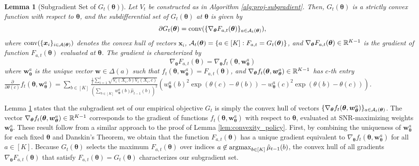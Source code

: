 \documentclass{article}
\newtheorem{lemma}{Lemma}
\begin{document}
\begin{lemma}[Subgradient Set of $G_t(\bm{\theta})$]\label{lem:subgradient_lemma}
    Let $V_t$ be constructed as in Algorithm \ref{alg:proj-subgradient}. Then, $G_t(\bm{\theta})$ is a strictly convex function with respect to $\bm{\theta}$, and the subdifferential set of $G_t(\bm\theta)$ at $\bm{\theta}$ is given by 
    \begin{equation}
        \partial G_t(\boldsymbol{\theta}) = \text{conv}(\{\nabla_{\boldsymbol\theta} F_{a,t}(\boldsymbol{\theta})\}_{a \in \mathcal{A}_t(\boldsymbol{\theta})}), 
    \end{equation}
    where $\text{conv}(\{\boldsymbol{x}_i\}_{i \in \mathcal{A}(\boldsymbol{\theta})})$ denotes the convex hull of vectors $\bm{x}_i$, $\mathcal{A}_t(\boldsymbol{\theta}) = \{a \in [K]: F_{a,t} = G_t(\boldsymbol{\theta})\}$, and $\nabla_{\boldsymbol\theta} F_{a,t}(\boldsymbol{\theta}) \in \mathbb{R}^{K-1}$ is the gradient of function $F_{a,t}(\bm{\theta})$ evaluated at $\bm{\theta}$. The gradient is characterized by \begin{equation}\label{eq:danskin_application}
        \nabla_{\bm\theta} F_{a,t}(\bm{\theta}) = \nabla_{\bm{\theta}} f_{t}(\bm{\theta}, \bm{w}^a_{\bm{\theta}})
    \end{equation}
    where $\bm{w}^a_{\bm{\theta}}$ is the unique vector $\bm{w} \in \Delta(a)$ such that $f_{t}(\bm{\theta}, \bm{w}_{\bm\theta}^a) = F_{a,t}(\bm{\theta})$, and $\nabla_{\boldsymbol{\theta}} f_{t}(\boldsymbol{\theta}, \boldsymbol{w}^a_{\boldsymbol{\theta}}) \in \mathbb{R}^{K-1}$ has $c$-th entry $\frac{\partial}{\partial \theta(c)} f_{t}(\bm\theta, \bm{w}_{\bm\theta}^a) =  \sum_{b \in [K]}\frac{\frac{1}{t}\sum_{i=1}^t\sqrt{V_i(X_i,b)V_i(X_i,c)} }{\left(\sum_{b \in [K]} w_{\bm{\theta}}^a(b) \hat\mu_{t-1}(b)\right)^2} \left(  w_{\bm\theta}^a(b)^2\exp(\theta(c) - \theta(b)) - w_{\bm\theta}^a(c)^2 \exp(\theta(b)-\theta(c))\right)$.
\end{lemma}


Lemma \ref{lem:subgradient_lemma} states that the subgradient set of our empirical objective $G_t$ is simply the convex hull of vectors $\{\nabla_{\boldsymbol\theta}f_{t}(\boldsymbol{\theta}, \boldsymbol{w}_{\boldsymbol\theta}^a)\}_{a \in \mathcal{A}_t(\boldsymbol{\theta})}$. The vector $\nabla_{\boldsymbol\theta}f_{t}(\boldsymbol{\theta}, \boldsymbol{w}_{\boldsymbol\theta}^a) \in \mathbb{R}^{K-1}$ corresponds to the gradient of functions $f_t(\bm{\theta}, \bm{w}_{\bm\theta}^a)$ with respect to $\bm{\theta}$, evaluated at SNR-maximizing weights $\bm{w}_{\bm\theta}^a$. These result follow from a similar approach to the proof of Lemma \ref{lem:convexity_policy}. First, by combining the uniqueness of $\bm{w}_{\bm\theta}^a$ for each fixed $\bm{\theta}$ and Danskin's Theorem, we obtain that the function $F_{a,t}(\bm{\theta})$ has a unique gradient equivalent to $\nabla_{\bm{\theta}} f_t(\bm{\theta}, \bm{w}_{\bm\theta}^a)$ for all $a \in [K]$. Because $G_t(\bm{\theta})$ selects the maximum $F_{a,t}(\bm{\theta})$ over indices $a \not\in \argmax_{b \in [K]}\hat\mu_{t-1}(b)$, the convex hull of all gradients $\nabla_{\bm\theta} F_{a,t}(\bm{\theta})$ that satisfy $F_{a,t}(\bm{\theta}) = G_t(\bm{\theta})$ characterizes our subgradient set. 
\end{document}
